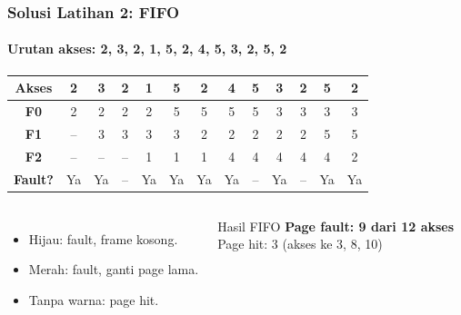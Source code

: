 \documentclass[t,aspectratio=169,xcolor=dvipsnames]{beamer}
\begin{document}
\begin{frame}
    \frametitle{Solusi Latihan 2: FIFO}
    \framesubtitle{Urutan akses: 2, 3, 2, 1, 5, 2, 4, 5, 3, 2, 5, 2}
    \footnotesize

    \begin{tabular}{|c|c|c|c|c|c|c|c|c|c|c|c|c|}
        \hline
        \textbf{Akses} & 2 & 3 & 2 & 1 & 5 & 2 & 4 & 5 & 3 & 2 & 5 & 2 \\
        \hline
        \textbf{F0} & \cellcolor{green!20}2 & 2 & 2 & 2 & \cellcolor{red!20}5 & 5 & 5 & 5 & \cellcolor{red!20}3 & 3 & 3 & 3 \\
        \hline
        \textbf{F1} & -- & \cellcolor{green!20}3 & 3 & 3 & 3 & \cellcolor{red!20}2 & 2 & 2 & 2 & 2 & \cellcolor{red!20}5 & 5 \\
        \hline
        \textbf{F2} & -- & -- & -- & \cellcolor{green!20}1 & 1 & 1 & \cellcolor{red!20}4 & 4 & 4 & 4 & 4 & \cellcolor{red!20}2 \\
        \hline
        \textbf{Fault?} & \cellcolor{green!20}Ya & \cellcolor{green!20}Ya & -- & \cellcolor{green!20}Ya & \cellcolor{red!20}Ya & \cellcolor{red!20}Ya & \cellcolor{red!20}Ya & -- & \cellcolor{red!20}Ya & -- & \cellcolor{red!20}Ya & \cellcolor{red!20}Ya \\
        \hline
    \end{tabular}

    \vspace{0.15cm}
    \begin{columns}[T]
        \begin{itemize}
            \item \colorbox{green!20}{Hijau}: fault, frame kosong.
            \item \colorbox{red!20}{Merah}: fault, ganti page lama.
            \item Tanpa warna: page hit.
        \end{itemize}

        \begin{alertblock}{Hasil FIFO}
            \textbf{Page fault: 9 dari 12 akses}\\
            Page hit: 3 (akses ke 3, 8, 10)
        \end{alertblock}
    \end{columns}
\end{frame}
\end{document}
